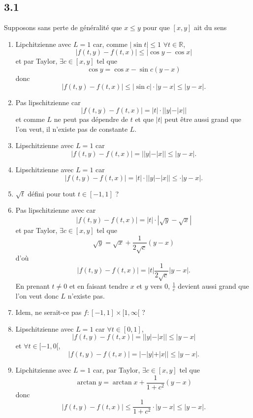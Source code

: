 \documentclass[fontsize=12pt]{article}
\begin{document}
\subsection*{3.1}
Supposons sans perte de généralité que $x \leq y$ pour que $[x,y]$ ait du sens
\begin{enumerate}
  \item Lipchitzienne avec $L = 1$ car, comme
    $|\sin t| \leq 1$ $\forall t \in \mathbb{R}$,
    \[ |f(t,y) - f(t,x)| \leq |\cos y - \cos x| \]
    et par Taylor, $\exists c \in [x,y]$ tel que
    \[ \cos y = \cos x - \sin c (y - x) \]
    donc
    \[ |f(t,y) - f(t,x)| \leq |\sin c| \cdot |y - x| \leq |y - x|. \]
  \item Pas lipschitzienne car
    \[ |f(t,y) - f(t,x)| = |t|\cdot||y| - |x|| \]
    et comme $L$ ne peut pas dépendre de $t$ et que $|t|$ peut être aussi
    grand que l'on veut, il n'existe pas de constante $L$.
  \item Lipschitzienne avec $L = 1$ car
    \[ |f(t,y) - f(t,x)| = ||y| - |x|| \leq |y - x|. \]
  \item Lipschitzienne avec $L = 1$ car
    \[ |f(t,y) - f(t,x)| = |t|\cdot||y| - |x|| \leq \cdot |y - x|. \]
  \item $\sqrt{t}$ défini pour tout $t \in [-1,1]$ ?
  \item Pas lipschitzienne avec car
    \[ |f(t,y) - f(t,x)| = |t|\cdot|\sqrt{y} - \sqrt{x}| \]
    et par Taylor, $\exists c \in [x,y]$ tel que
    \[ \sqrt{y} = \sqrt{x} + \frac{1}{2\sqrt{c}}(y-x) \]
    d'où
    \[ |f(t,y) - f(t,x)| = |t|\frac{1}{2\sqrt{c}}|y-x|. \]
    En prenant $t \neq 0$ et en faisant tendre $x$ et $y$ vers 0,
    $\frac{1}{c}$ devient aussi grand que l'on veut donc $L$ n'existe pas.
  \item Idem, ne serait-ce pas $f:[-1,1]\times[1,\infty[$ ?
  \item Lipschitzienne avec $L = 1$ car $\forall t \in [0,1]$,
    \[ |f(t,y) - f(t,x)| = ||y| - |x|| \leq |y - x| \]
    et $\forall t \in [-1,0[$,
    \[ |f(t,y) - f(t,x)| = |-|y| + |x|| \leq |y - x|. \]
  \item Lipchitzienne avec $L = 1$ car, par Taylor,
    $\exists c \in [x,y]$ tel que
    \[ \arctan y = \arctan x + \frac{1}{1+c^2} (y - x) \]
    donc
    \[ |f(t,y) - f(t,x)| \leq \frac{1}{1+c^2} \cdot |y - x| \leq |y - x|. \]
\end{enumerate}
\end{document}

